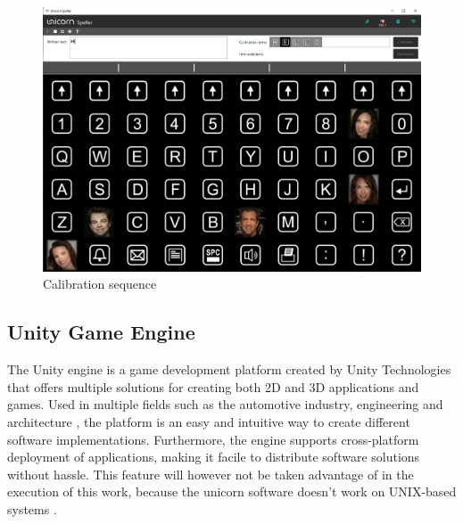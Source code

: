 \begin{figure}[H]
  \centering
  \includegraphics[width=1\textwidth]{Graphics/Speller Calibration.png}
  \caption{Calibration sequence}
  \label{fig:speller calibration sequence}
\end{figure}
\vspace{\baselineskip}


\subsection{Unity Game Engine}
The Unity engine is a game development platform created by Unity Technologies that offers multiple solutions for creating both 2D and 3D applications and games. Used in multiple fields such as the automotive industry, engineering and architecture \cite{Unity_engine}, the platform is an easy and intuitive way to create different software implementations. Furthermore, the engine supports cross-platform deployment of applications, making it facile to distribute software solutions without hassle. This feature will however not be taken advantage of in the execution of this work, because the unicorn software doesn't work on UNIX-based systems \cite{UnicornSuite_Manual}.
\vspace{\baselineskip}


